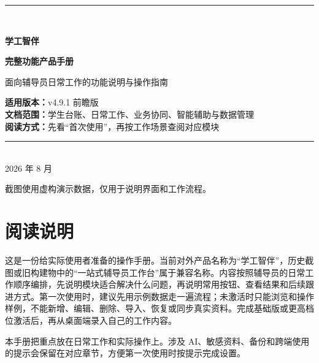 \documentclass[UTF8,zihao=-4,oneside]{ctexrep}
\newcommand{\productname}{学工智伴}
\newcommand{\version}{v4.9.1 前瞻版}
\begin{document}
\begin{titlepage}
  \thispagestyle{empty}
  \vspace*{20mm}
  \begin{center}
    {\color{CWBblue}\rule{0.72\textwidth}{1.3pt}}\\[12mm]
    {\Huge\bfseries\color{CWBink} \productname\par}
    \vspace{7mm}
    {\LARGE\bfseries 完整功能产品手册\par}
    \vspace{8mm}
    {\large\color{CWBgray}面向辅导员日常工作的功能说明与操作指南\par}
    \vfill
    \begin{tcolorbox}[width=0.78\textwidth,colback=CWBfill,colframe=CWBline,boxrule=0.5pt,arc=1.5mm]
      \centering
      \large
      \textbf{适用版本：}\version\\[4pt]
      \textbf{文档范围：}学生台账、日常工作、业务协同、智能辅助与数据管理\\[4pt]
      \textbf{阅读方式：}先看“首次使用”，再按工作场景查阅对应模块
    \end{tcolorbox}
    \vfill
    {\color{CWBgray}\rule{0.72\textwidth}{0.4pt}}\\[5mm]
    {\large 2026 年 8 月}\par
    \vspace{4mm}
    {\small\color{CWBgray}截图使用虚构演示数据，仅用于说明界面和工作流程。}
  \end{center}
\end{titlepage}

\chapter*{阅读说明}

这是一份给实际使用者准备的操作手册。当前对外产品名称为“学工智伴”，历史截图或旧构建物中的“一站式辅导员工作台”属于兼容名称。内容按照辅导员的日常工作顺序编排，先说明模块适合解决什么问题，再说明常用按钮、查看结果和后续跟进方式。第一次使用时，建议先用示例数据走一遍流程；未激活时只能浏览和操作样例，不能新增、编辑、删除、导入、恢复或同步真实资料。完成基础版或更高档位激活后，再从桌面端录入自己的工作内容。

\begin{infobox}
本手册把重点放在日常工作和实际操作上。涉及 AI、敏感资料、备份和跨端使用的提示会保留在对应章节，方便第一次使用时按提示完成设置。
\end{infobox}
\end{document}
